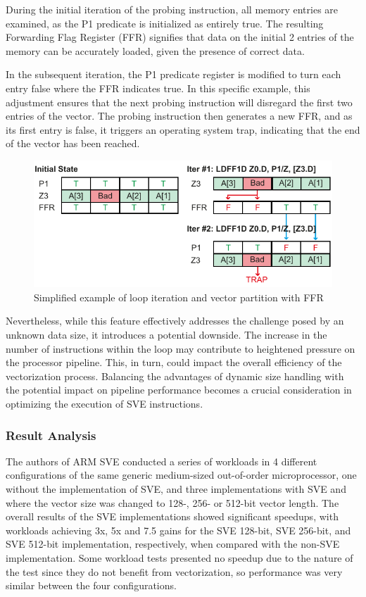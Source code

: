 During the initial iteration of the probing instruction, all memory entries are examined, as the P1 predicate is initialized as entirely true. The resulting Forwarding Flag Register (FFR) signifies that data on the initial 2 entries of the memory can be accurately loaded, given the presence of correct data.

In the subsequent iteration, the P1 predicate register is modified to turn each entry false where the FFR indicates true. In this specific example, this adjustment ensures that the next probing instruction will disregard the first two entries of the vector. The probing instruction then generates a new FFR, and as its first entry is false, it triggers an operating system trap, indicating that the end of the vector has been reached.



\begin{figure}[H]
	\begin{center}
 		\includegraphics[width=0.77\linewidth]{images/ffr-example final.pdf}
 		\caption{Simplified example of loop iteration and vector partition with FFR}
 		\label{fig:ffr-example}
	\end{center} 
\end{figure}

Nevertheless, while this feature effectively addresses the challenge posed by an unknown data size, it introduces a potential downside. The increase in the number of instructions within the loop may contribute to heightened pressure on the processor pipeline. This, in turn, could impact the overall efficiency of the vectorization process. Balancing the advantages of dynamic size handling with the potential impact on pipeline performance becomes a crucial consideration in optimizing the execution of SVE instructions.

\subsubsection{Result Analysis}

 The authors of ARM SVE \cite{arm-paper} conducted a series of workloads in 4 different configurations of the same generic medium-sized out-of-order microprocessor, one without the implementation of SVE, and three implementations with SVE and where the vector size was changed to 128-, 256- or 512-bit vector length.
The overall results of the SVE implementations showed significant speedups, with workloads achieving 3x, 5x and 7.5 gains for the SVE 128-bit, SVE 256-bit, and SVE 512-bit implementation, respectively, when compared with the non-SVE implementation. Some workload tests presented no speedup due to the nature of the test since they do not benefit from vectorization, so performance was very similar between the four configurations.



